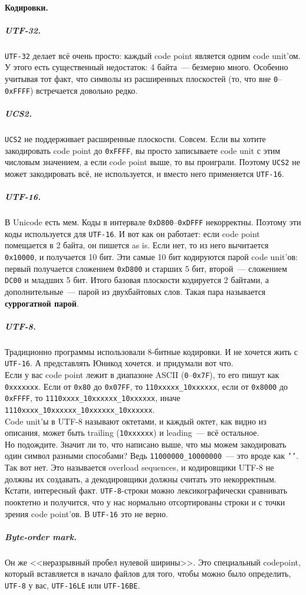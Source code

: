 \documentclass{article}
\begin{document}
    \paragraph{Кодировки.}
    \subparagraph{UTF-32.}
    \Verb|UTF-32| делает всё очень просто: каждый code point является одним code unit'ом. У этого есть существенный недостаток: 4 байта~--- безмерно много. Особенно учитывая тот факт, что символы из расширенных плоскостей (то, что вне \texttt{0}--\texttt{0xFFFF}) встречается довольно редко.
    \subparagraph{UCS2.}
    \Verb|UCS2| не поддерживает расширенные плоскости. Совсем. Если вы хотите закодировать code point до \texttt{0xFFFF}, вы просто записываете code unit с этим числовым значением, а если code point выше, то вы проиграли. Поэтому \Verb|UCS2| не может закодировать всё, не используется, и вместо него применяется \Verb|UTF-16|.
    \subparagraph{UTF-16.}
    В Unicode есть мем. Коды в интервале \texttt{0xD800}--\texttt{0xDFFF} некорректны. Поэтому эти коды используется для \Verb|UTF-16|. И вот как он работает: если code point помещается в 2 байта, он пишется as is. Если нет, то из него вычитается \texttt{0x10000}, и получается 10 бит. Эти самые 10 бит кодируются парой code unit'ов: первый получается сложением \texttt{0xD800} и старших 5 бит, второй~--- сложением \texttt{DC00} и младших 5 бит. Итого базовая плоскости кодируется 2 байтами, а дополнительные~--- парой из двухбайтовых слов. Такая пара называется \textbf{суррогатной парой}.
    \subparagraph{UTF-8.}
    Традиционно программы использовали 8-битные кодировки. И не хочется жить с \Verb|UTF-16|. А представлять Юникод хочется. и придумали вот что.\\
    Если у вас code point лежит в диапазоне ASCII (\texttt{0}--\texttt{0x7F}), то его пишут как \Verb|0xxxxxxx|. Если от \texttt{0x80} до \texttt{0x07FF}, то \Verb|110xxxxx_10xxxxxx|, если от \texttt{0x8000} до \texttt{0xFFFF}, то \Verb|1110xxxx_10xxxxxx_10xxxxxx|, иначе \Verb|1110xxxx_10xxxxxx_10xxxxxx_10xxxxxx|.\\
    Code unit'ы в UTF-8 называют октетами, и каждый октет, как видно из описания, может быть trailing (\Verb|10xxxxxx|) и leading~--- всё остальное.\\
    Но подождите. Значит ли то, что написано выше, что мы можем закодировать один символ разными способами? Ведь \Verb|11000000_10000000|~--- это вроде как \texttt{'\0'}. Так вот нет. Это называется overload sequences, и кодировщики UTF-8 не должны их создавать, а декодировщики должны считать это некорректным.\\
    Кстати, интересный факт. \Verb|UTF-8|-строки можно лексикографически сравнивать пооктетно и получится, что у нас нормально отсортированы строки и с точки зрения code point'ов. В \Verb|UTF-16| это не верно.
    \subparagraph{Byte-order mark.}
    Он же <<неразрывный пробел нулевой ширины>>. Это специальный codepoint, который вставляется в начало файлов для того, чтобы можно было определить, \Verb|UTF-8| у вас, \Verb|UTF-16LE| или \Verb|UTF-16BE|.
\end{document}
